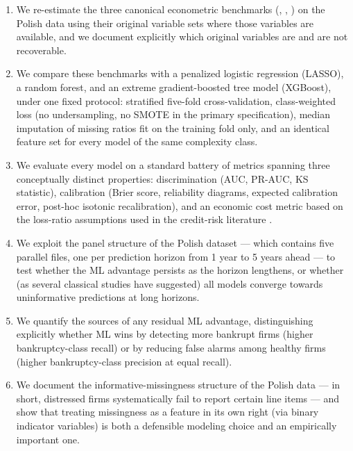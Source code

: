 \documentclass[11pt,a4paper]{article}
\begin{document}
\begin{enumerate}
\item We re-estimate the three canonical econometric benchmarks
(\citealt{altman1968}, \citealt{ohlson1980}, \citealt{zmijewski1984}) on the
Polish data using their original variable sets where those variables are
available, and we document explicitly which original variables are and are
not recoverable.

\item We compare these benchmarks with a penalized logistic regression
(LASSO), a random forest, and an extreme gradient-boosted tree model
(XGBoost), under one fixed protocol: stratified five-fold cross-validation,
class-weighted loss (no undersampling, no SMOTE in the primary specification),
median imputation of missing ratios fit on the training fold only, and an
identical feature set for every model of the same complexity class.

\item We evaluate every model on a standard battery of metrics spanning
three conceptually distinct properties: discrimination (AUC, PR-AUC, KS
statistic), calibration (Brier score, reliability diagrams, expected
calibration error, post-hoc isotonic recalibration), and an economic cost
metric based on the loss-ratio assumptions used in the credit-risk
literature \citep{altman2007}.

\item We exploit the panel structure of the Polish dataset --- which contains
five parallel files, one per prediction horizon from 1 year to 5 years ahead
--- to test whether the ML advantage persists as the horizon lengthens, or
whether (as several classical studies have suggested)
\citep{mossman1998, duan2012} all models converge towards uninformative
predictions at long horizons.

\item We quantify the sources of any residual ML advantage, distinguishing
explicitly whether ML wins by detecting more bankrupt firms (higher
bankruptcy-class recall) or by reducing false alarms among healthy firms
(higher bankruptcy-class precision at equal recall).

\item We document the informative-missingness structure of the Polish data
--- in short, distressed firms systematically fail to report certain
line items --- and show that treating missingness as a feature in its own
right (via binary indicator variables) is both a defensible modeling choice
and an empirically important one.
\end{enumerate}
\end{document}
